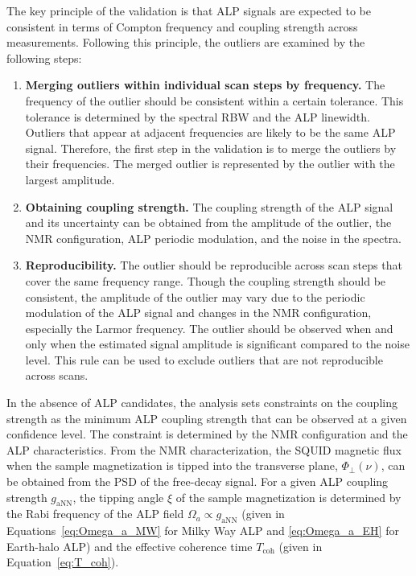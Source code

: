The key principle of the validation is that ALP signals are expected to be consistent in terms of Compton frequency and coupling strength across measurements.
Following this principle, the outliers are examined by the following steps:
\begin{enumerate}[label=\arabic*.]
    \item \textbf{Merging outliers within individual scan steps by frequency.} The frequency of the outlier should be consistent within a certain tolerance. This tolerance is determined by the spectral RBW and the ALP linewidth. Outliers that appear at adjacent frequencies are likely to be the same ALP signal. Therefore, the first step in the validation is to merge the outliers by their frequencies. The merged outlier is represented by the outlier with the largest amplitude.
    \item \textbf{Obtaining coupling strength.} The coupling strength of the ALP signal and its uncertainty can be obtained from the amplitude of the outlier, the NMR configuration, ALP periodic modulation, and the noise in the spectra.
    \item \textbf{Reproducibility.} The outlier should be reproducible across scan steps that cover the same frequency range. Though the coupling strength should be consistent, the amplitude of the outlier may vary due to the periodic modulation of the ALP signal and changes in the NMR configuration, especially the Larmor frequency. The outlier should be observed when and only when the estimated signal amplitude is significant compared to the noise level. This rule can be used to exclude outliers that are not reproducible across scans.
\end{enumerate}
In the absence of ALP candidates, the analysis sets constraints on the coupling strength as the minimum ALP coupling strength that can be observed at a given confidence level.
The constraint is determined by the NMR configuration and the ALP characteristics.
From the NMR characterization, the SQUID magnetic flux when the sample magnetization is tipped into the transverse plane, $\Phi_\perp(\nu)$, can be obtained from the PSD of the free-decay signal.
For a given ALP coupling strength $g_{\mathrm{aNN}}$, the tipping angle $\xi$ of the sample magnetization is determined by the Rabi frequency of the ALP field $\Omega_a \propto g_{\mathrm{aNN}}$ (given in Equations~\eqref{eq:Omega_a_MW} for Milky Way ALP and \eqref{eq:Omega_a_EH} for Earth-halo ALP) and the effective coherence time $T_\mathrm{coh}$ (given in Equation~\eqref{eq:T_coh}).
